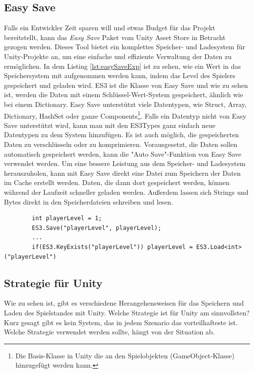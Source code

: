 \subsection{Easy Save}
Falls ein Entwickler Zeit sparen will und etwas Budget für das Projekt bereitstellt, kann das \textit{Easy Save} Paket vom Unity Asset Store in Betracht gezogen werden. Dieses Tool bietet ein komplettes Speicher- und Ladesystem für Unity-Projekte an, um eine einfache und effiziente Verwaltung der Daten zu ermöglichen.\cite{unityEasySave} In dem Listing \ref{lst:easySaveExp} ist zu sehen, wie ein Wert in das Speichersystem mit aufgenommen werden kann, indem das Level des Spielers gespeichert und geladen wird. ES3 ist die Klasse von Easy Save und wie zu sehen ist, werden die Daten mit einem Schlüssel-Wert-System gespeichert, ähnlich wie bei einem Dictionary.\cite{moodkieGettingStarted} Easy Save unterstützt viele Datentypen, wie Struct, Array, Dictionary, HashSet oder ganze Components\footnote{Die Basis-Klasse in Unity die an den Spielobjekten (GameObject-Klasse) hinzugefügt werden kann.\cite{unityComponent}}.\cite{moodkieSupportedTypes} Falls ein Datentyp nicht von Easy Save unterstützt wird, kann man mit den ES3Types ganz einfach neue Datentypen zu dem System hinzufügen.\cite{moodkieChoosingWhat} Es ist auch möglich, die gespeicherten Daten zu verschlüsseln oder zu komprimieren.\cite{moodkieGettingStarted} Vorausgesetzt, die Daten sollen automatisch gespeichert werden, kann die "Auto Save"-Funktion von Easy Save verwendet werden.\cite{moodkieAutoSave} Um eine bessere Leistung aus dem Speicher- und Ladesystem herauszuholen, kann mit Easy Save direkt eine Datei zum Speichern der Daten im Cache erstellt werden. Daten, die dann dort gespeichert werden, können während der Laufzeit schneller geladen werden.\cite{moodkieImprovingPerformance} Außerdem lassen sich Strings und Bytes direkt in den Speicherdateien schreiben und lesen.\cite{moodkieSavingLoading} 

\begin{listing}[htp]
    \begin{verbatim} 
        int playerLevel = 1;
        ES3.Save("playerLevel", playerLevel);
        ... 
        if(ES3.KeyExists("playerLevel")) playerLevel = ES3.Load<int>("playerLevel")
    \end{verbatim}
    \caption{Speichern und Laden eines Integers mit Easy Save}
    \label{lst:easySaveExp}
\end{listing}



\subsection{Strategie für Unity}
Wie zu sehen ist, gibt es verschiedene Herangehensweisen für das Speichern und Laden des Spielstandes mit Unity. Welche Strategie ist für Unity am sinnvollsten? Kurz gesagt gibt es kein System, das in jedem Szenario das vorteilhafteste ist. Welche Strategie verwendet werden sollte, hängt von der Situation ab. 

